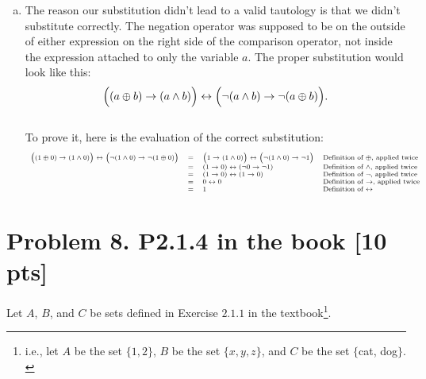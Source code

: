 \documentclass[12pt]{article}
\begin{document}
\begin{enumerate}[(a)]
		\item The reason our substitution didn't lead to a valid tautology is that we
			didn't substitute correctly. The negation operator was supposed to be on
			the outside of either expression on the right side of the comparison
			operator, not inside the expression attached to only the variable $a$. The
			proper substitution would look like this:
			\[
				\Bigl((a \oplus b) \rightarrow (a \land b)\Bigr) \leftrightarrow \Bigl(\neg
				(a \land b) \rightarrow \neg( a \oplus b)\Bigr).
			\]
			\\
			To prove it, here is the evaluation of the correct substitution:
			\[
				\scriptsize
				\begin{array}{rcll}
					\Bigl((1 \oplus 0) \rightarrow (1 \land 0)\Bigr) \leftrightarrow \Bigl(\neg(1 \land 0) \rightarrow \neg(1 \oplus 0)\Bigr) & = & \Bigl(1 \rightarrow (1 \land 0)\Bigr) \leftrightarrow \Bigl(\neg(1 \land 0) \rightarrow \neg 1\Bigr) & \mbox{Definition of $\oplus$, applied twice}      \\
					                                                                                                                          & = & (1 \rightarrow 0) \leftrightarrow (\neg 0 \rightarrow \neg 1)                                        & \mbox{Definition of $\land$, applied twice}       \\
					                                                                                                                          & = & (1 \rightarrow 0) \leftrightarrow (1 \rightarrow 0)                                                  & \mbox{Definition of $\neg$, applied twice}        \\
					                                                                                                                          & = & 0 \leftrightarrow 0                                                                                  & \mbox{Definition of $\rightarrow$, applied twice} \\
					                                                                                                                          & = & 1                                                                                                    & \mbox{Definition of $\leftrightarrow$}
				\end{array}
			\]
	\end{enumerate}

	\newpage

	\section*{\textbf{Problem 8. P2.1.4 in the book} [10 pts]}
	Let $A$, $B$, and $C$ be sets defined in Exercise $2.1.1$ in the textbook\footnote{i.e.,
	let $A$ be the set $\{1, 2\}$, $B$ be the set $\{x, y, z\}$, and $C$ be the
	set $\{$cat, dog$\}.$}.
\end{document}

